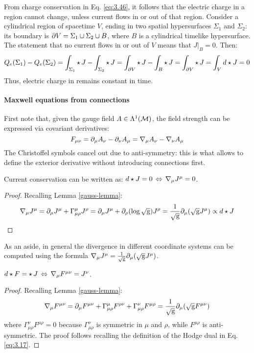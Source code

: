 From charge conservation in Eq. \ref{eq:3.46}, it follows that the electric charge in a region cannot change, unless current flows in or out of that region. Consider a cylindrical region of spacetime $ V $, ending in two spatial hypersurfaces $ \Sigma_1 $ and $ \Sigma_2 $: its boundary is $ \partial V = \Sigma_1 \cup \Sigma_2 \cup B $, where $ B $ is a cylindrical timelike hypersurface. The statement that no current flows in or out of $ V $ means that $ J \vert_B = 0 $. Then:
\begin{equation*}
  Q_e(\Sigma_1) - Q_e(\Sigma_2) = \int_{\Sigma_1} \star\, J - \int_{\Sigma_2} \star\, J = \int_{\partial V} \star\, J - \int_B \star\, J = \int_{\partial V} \star\, J = \int_V d\star J = 0
\end{equation*}
Thus, electric charge in remains constant in time.

\paragraph{Maxwell equations from connections} First note that, given the gauge field $ A \in \Lambda^{1}(\mathcal{M}) $, the field strength can be expressed via covariant derivatives:
\begin{equation*}
  F_{\mu \nu} = \partial_\mu A_\nu - \partial_\nu A_\mu = \nabla_\mu A_\nu - \nabla_\nu A_\mu
\end{equation*}
The Christoffel symbols cancel out due to anti-symmetry: this is what allows to define the exterior derivative without introducing connections first.

\begin{proposition}
  Current conservation can be written as: $ d \star J = 0 \,\Leftrightarrow\, \nabla_\mu J^\mu = 0 $.
\end{proposition}
\begin{proof}
  Recalling Lemma \ref{gauss-lemma}:
  \begin{equation*}
    \nabla_\mu J^\mu = \partial_\mu J^\mu + \Gamma^\mu_{\mu \rho} J^\rho = \partial_\mu J^\mu + \partial_\rho (\log \sqrt{\mathrm{g}}) J^\rho = \frac{1}{\sqrt{\mathrm{g}}} \partial_\mu (\sqrt{\mathrm{g}} J^\mu) \propto d \star J
  \end{equation*}
\end{proof}

As an aside, in general the divergence in different coordinate systems can be computed using the formula $ \nabla_\mu J^\mu = \frac{1}{\sqrt{\mathrm{g}}} \partial_\mu (\sqrt{\mathrm{g}} J^\mu) $.

\begin{proposition}
  $ d \star F = \star\, J \,\Leftrightarrow\, \nabla_\mu F^{\mu \nu} = J^\nu $.
\end{proposition}
\begin{proof}
  Recalling Lemma \ref{gauss-lemma}:
  \begin{equation*}
    \nabla_\mu F^{\mu \nu} = \partial_\mu F^{\mu \nu} + \Gamma^\mu_{\mu \rho} F^{\rho \nu} + \Gamma^\nu_{\mu \rho} F^{\mu \rho} = \frac{1}{\sqrt{\mathrm{g}}} \partial_\mu (\sqrt{\mathrm{g}} F^{\mu \nu})
  \end{equation*}
  where $ \Gamma^\nu_{\mu \rho} F^{\mu \rho} = 0 $ because $ \Gamma^\nu_{\mu \rho} $ is symmetric in $ \mu $ and $ \rho $, while $ F^{\mu \rho} $ is anti-symmetric. The proof follows recalling the definition of the Hodge dual in Eq. \ref{eq:3.17}.
\end{proof}

